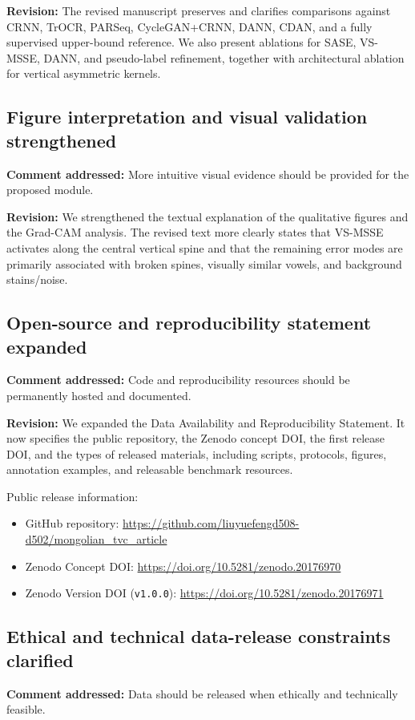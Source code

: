 \documentclass[11pt]{article}
\begin{document}
\textbf{Revision:} The revised manuscript preserves and clarifies comparisons against CRNN, TrOCR, PARSeq, CycleGAN+CRNN, DANN, CDAN, and a fully supervised upper-bound reference. We also present ablations for SASE, VS-MSSE, DANN, and pseudo-label refinement, together with architectural ablation for vertical asymmetric kernels.

\subsection{Figure interpretation and visual validation strengthened}
\textbf{Comment addressed:} More intuitive visual evidence should be provided for the proposed module.

\textbf{Revision:} We strengthened the textual explanation of the qualitative figures and the Grad-CAM analysis. The revised text more clearly states that VS-MSSE activates along the central vertical spine and that the remaining error modes are primarily associated with broken spines, visually similar vowels, and background stains/noise.

\subsection{Open-source and reproducibility statement expanded}
\textbf{Comment addressed:} Code and reproducibility resources should be permanently hosted and documented.

\textbf{Revision:} We expanded the Data Availability and Reproducibility Statement. It now specifies the public repository, the Zenodo concept DOI, the first release DOI, and the types of released materials, including scripts, protocols, figures, annotation examples, and releasable benchmark resources.

Public release information:
\begin{itemize}[leftmargin=1.5em]
\item GitHub repository: \url{https://github.com/liuyuefengd508-d502/mongolian_tvc_article}
\item Zenodo Concept DOI: \url{https://doi.org/10.5281/zenodo.20176970}
\item Zenodo Version DOI (\texttt{v1.0.0}): \url{https://doi.org/10.5281/zenodo.20176971}
\end{itemize}

\subsection{Ethical and technical data-release constraints clarified}
\textbf{Comment addressed:} Data should be released when ethically and technically feasible.
\end{document}
